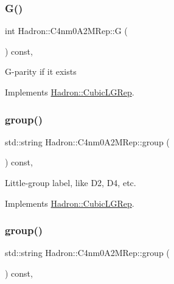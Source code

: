 \subsubsection{\texorpdfstring{G()}{G()}\hspace{0.1cm}{\footnotesize\ttfamily [2/2]}}
{\footnotesize\ttfamily int Hadron\+::\+C4nm0\+A2\+M\+Rep\+::G (\begin{DoxyParamCaption}{ }\end{DoxyParamCaption}) const\hspace{0.3cm}{\ttfamily [inline]}, {\ttfamily [virtual]}}

G-\/parity if it exists 

Implements \mbox{\hyperlink{structHadron_1_1CubicLGRep_ace26f7b2d55e3a668a14cb9026da5231}{Hadron\+::\+Cubic\+L\+G\+Rep}}.

\mbox{\label{structHadron_1_1C4nm0A2MRep_a45255be18f2b1908fcae5e6801e6778f}} 
\subsubsection{\texorpdfstring{group()}{group()}\hspace{0.1cm}{\footnotesize\ttfamily [1/2]}}
{\footnotesize\ttfamily std\+::string Hadron\+::\+C4nm0\+A2\+M\+Rep\+::group (\begin{DoxyParamCaption}{ }\end{DoxyParamCaption}) const\hspace{0.3cm}{\ttfamily [inline]}, {\ttfamily [virtual]}}

Little-\/group label, like D2, D4, etc. 

Implements \mbox{\hyperlink{structHadron_1_1CubicLGRep_a9bdb14b519a611d21379ed96a3a9eb41}{Hadron\+::\+Cubic\+L\+G\+Rep}}.

\mbox{\label{structHadron_1_1C4nm0A2MRep_a45255be18f2b1908fcae5e6801e6778f}} 
\subsubsection{\texorpdfstring{group()}{group()}\hspace{0.1cm}{\footnotesize\ttfamily [2/2]}}
{\footnotesize\ttfamily std\+::string Hadron\+::\+C4nm0\+A2\+M\+Rep\+::group (\begin{DoxyParamCaption}{ }\end{DoxyParamCaption}) const\hspace{0.3cm}{\ttfamily [inline]}, {\ttfamily [virtual]}}

